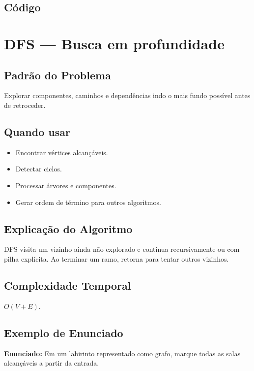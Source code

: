 \subsection{Código}

\section{DFS --- Busca em profundidade}

\subsection{Padrão do Problema}
Explorar componentes, caminhos e dependências indo o mais fundo possível antes de retroceder.

\subsection{Quando usar}
\begin{itemize}[nosep]
  \item Encontrar vértices alcançáveis.
  \item Detectar ciclos.
  \item Processar árvores e componentes.
  \item Gerar ordem de término para outros algoritmos.
\end{itemize}

\subsection{Explicação do Algoritmo}
DFS visita um vizinho ainda não explorado e continua recursivamente ou com pilha explícita. Ao terminar um ramo, retorna para tentar outros vizinhos.

\subsection{Complexidade Temporal}
$O(V + E)$.

\subsection{Exemplo de Enunciado}
\begin{exemplodiabox}
\textbf{Enunciado:} Em um labirinto representado como grafo, marque todas as salas alcançáveis a partir da entrada.
\end{exemplodiabox}

